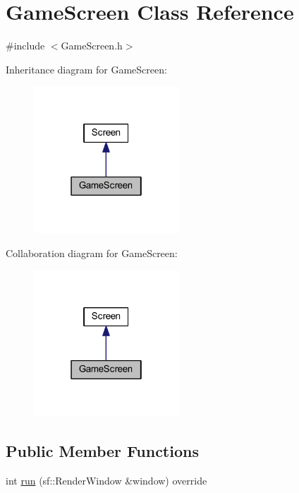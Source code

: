 \hypertarget{class_game_screen}{}\section{Game\+Screen Class Reference}
\label{class_game_screen}


{\ttfamily \#include $<$Game\+Screen.\+h$>$}



Inheritance diagram for Game\+Screen\+:\nopagebreak
\begin{figure}[H]
\begin{center}
\leavevmode
\includegraphics[width=154pt]{class_game_screen__inherit__graph}
\end{center}
\end{figure}


Collaboration diagram for Game\+Screen\+:\nopagebreak
\begin{figure}[H]
\begin{center}
\leavevmode
\includegraphics[width=154pt]{class_game_screen__coll__graph}
\end{center}
\end{figure}
\subsection*{Public Member Functions}
\begin{DoxyCompactItemize}
\item 
int \hyperlink{class_game_screen_a0e39ba2968e5fcec952119f7a9d6e437}{run} (sf\+::\+Render\+Window \&window) override
\end{DoxyCompactItemize}


